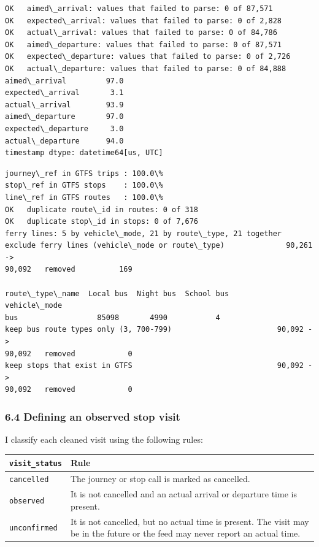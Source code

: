 \documentclass[11pt]{article}
\begin{document}
    \begin{Verbatim}[commandchars=\\\{\}]
OK   aimed\_arrival: values that failed to parse: 0 of 87,571
OK   expected\_arrival: values that failed to parse: 0 of 2,828
OK   actual\_arrival: values that failed to parse: 0 of 84,786
OK   aimed\_departure: values that failed to parse: 0 of 87,571
OK   expected\_departure: values that failed to parse: 0 of 2,726
OK   actual\_departure: values that failed to parse: 0 of 84,888
aimed\_arrival         97.0
expected\_arrival       3.1
actual\_arrival        93.9
aimed\_departure       97.0
expected\_departure     3.0
actual\_departure      94.0
timestamp dtype: datetime64[us, UTC]
    \end{Verbatim}

    \begin{Verbatim}[commandchars=\\\{\}]
journey\_ref in GTFS trips : 100.0\%
stop\_ref in GTFS stops    : 100.0\%
line\_ref in GTFS routes   : 100.0\%
OK   duplicate route\_id in routes: 0 of 318
OK   duplicate stop\_id in stops: 0 of 7,676
ferry lines: 5 by vehicle\_mode, 21 by route\_type, 21 together
exclude ferry lines (vehicle\_mode or route\_type)              90,261 ->
90,092   removed          169

route\_type\_name  Local bus  Night bus  School bus
vehicle\_mode
bus                  85098       4990           4
keep bus route types only (3, 700-799)                        90,092 ->
90,092   removed            0
keep stops that exist in GTFS                                 90,092 ->
90,092   removed            0
    \end{Verbatim}

    \subsubsection{6.4 Defining an observed stop
visit}\label{defining-an-observed-stop-visit}

I classify each cleaned visit using the following rules:

\begin{longtable}[]{@{}
  >{\raggedright\arraybackslash}p{}
  >{\raggedright\arraybackslash}p{}@{}}
\toprule\noalign{}
\begin{minipage}[b]{\linewidth}\raggedright
\texttt{visit\_status}
\end{minipage} & \begin{minipage}[b]{\linewidth}\raggedright
Rule
\end{minipage} \\
\midrule\noalign{}
\endhead
\bottomrule\noalign{}
\endlastfoot
\texttt{cancelled} & The journey or stop call is marked as cancelled. \\
\texttt{observed} & It is not cancelled and an actual arrival or
departure time is present. \\
\texttt{unconfirmed} & It is not cancelled, but no actual time is
present. The visit may be in the future or the feed may never report an
actual time. \\
\end{longtable}
\end{document}
